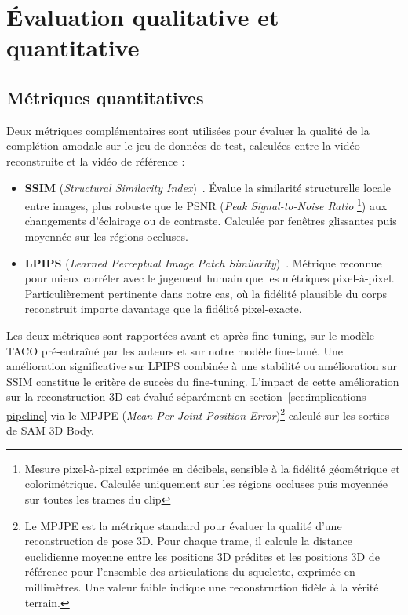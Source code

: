 \section{Évaluation qualitative et quantitative}

\subsection{Métriques quantitatives}

Deux métriques complémentaires sont utilisées pour évaluer la qualité de la complétion amodale sur le jeu de données de test, calculées entre la vidéo reconstruite et la vidéo de référence :

\begin{itemize}
  \item \textbf{SSIM} (\textit{Structural Similarity Index})~\cite{SSIM-2004}. Évalue la similarité structurelle locale entre images, plus robuste que le PSNR (\textit{Peak Signal-to-Noise Ratio} \footnote{Mesure pixel-à-pixel exprimée en décibels, sensible à la fidélité géométrique et colorimétrique. Calculée uniquement sur les régions occluses puis moyennée sur toutes les trames du clip}) aux changements d'éclairage ou de contraste. Calculée par fenêtres glissantes puis moyennée sur les régions occluses.
  
  \item \textbf{LPIPS} (\textit{Learned Perceptual Image Patch Similarity})~\cite{LPIPS-2018}. Métrique reconnue pour mieux corréler avec le jugement humain que les métriques pixel-à-pixel. Particulièrement pertinente dans notre cas, où la fidélité plausible du corps reconstruit importe davantage que la fidélité pixel-exacte.
\end{itemize}

Les deux métriques sont rapportées avant et après fine-tuning, sur le modèle TACO pré-entraîné par les auteurs et sur notre modèle fine-tuné. Une amélioration significative sur LPIPS combinée à une stabilité ou amélioration sur SSIM constitue le critère de succès du fine-tuning. L'impact de cette amélioration sur la reconstruction 3D est évalué séparément en section~\ref{sec:implications-pipeline} via le MPJPE (\textit{Mean Per-Joint Position Error})\footnote{Le MPJPE est la métrique standard pour évaluer la qualité d'une reconstruction de pose 3D. Pour chaque trame, il calcule la distance euclidienne moyenne entre les positions 3D prédites et les positions 3D de référence pour l'ensemble des articulations du squelette, exprimée en millimètres. Une valeur faible indique une reconstruction fidèle à la vérité terrain.} calculé sur les sorties de SAM 3D Body.

